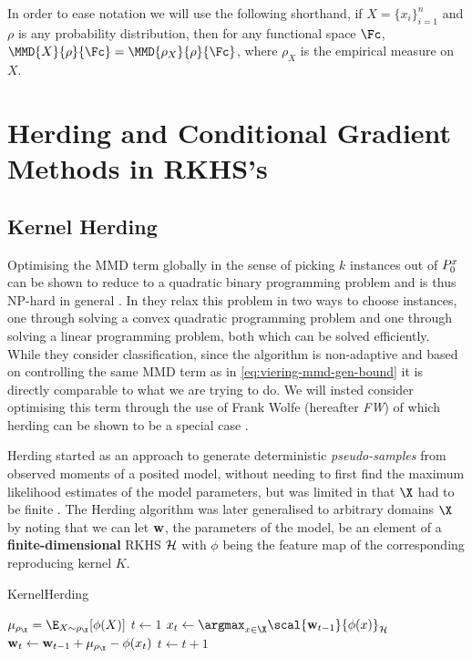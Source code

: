 In order to ease notation we will use the following shorthand, if \(X =
\{x_i\}_{i=1}^n\) and \(\rho\) is any probability distribution, then for any
functional space \(\Fc\), \(\MMD{X}{\rho}{\Fc} =
\MMD{\rho_X}{\rho}{\Fc}\), where \(\rho_X\) is the empirical measure
on \(X\).

\section{Herding and Conditional Gradient Methods in RKHS's}
\subsection{Kernel Herding}
Optimising the MMD term globally in the sense of
picking \(k\) instances out of \(P^x_{0}\) can be shown to reduce to a
quadratic binary programming problem and is thus NP-hard in general
\citep{chaovalitwongse09_quadr_integ_progr}. In
\citep{chattopadhyay13_batch_mode_activ_sampl_based} they relax this problem in
two ways to choose instances, one through solving a convex quadratic programming
problem and one through solving a linear programming problem, both which can be
solved efficiently. While they consider classification, since the algorithm is
non-adaptive and based on controlling the same MMD term as in
\ref{eq:viering-mmd-gen-bound} it is directly comparable to what we are trying
to do. We will insted consider optimising this term through the use of
Frank Wolfe \citep{frank56_algor_quadr_progr,jaggi13_revis_frank_wolfe}
(hereafter \textit{FW}) of which
herding can be shown to be a special case
\citep{bach12_equiv_between_herdin_condit_gradien_algor}.

Herding started as an approach to generate deterministic \emph{pseudo-samples}
from observed moments of a posited model, without needing to first find the
maximum likelihood estimates of the model parameters, but was limited in that
\(\X\) had to be finite \citep{welling09_herdin}. The Herding algorithm was later
generalised to arbitrary domains \(\X\) by
\citep{chen12_super_sampl_from_kernel_herdin} noting that we can let \(\mathbf{w}\),
the parameters of the model, be an element of a \textbf{finite-dimensional} RKHS
\(\mathcal{H}\) with \(\phi\) being the feature map of the corresponding
reproducing kernel \(K\).
\begin{algorithm}
  \caption{KernelHerding}\label{alg:kernel-herding}
  \begin{algorithmic}[1]
     \State $\mu_{\rho_{\X}} = \E_{X \sim
\rho_{\X}}[\phi(X)]$ \State $t \gets 1$  \State $x_{t} \gets
\argmax_{x \in \X} \scal{\mat{w}_{t-1}}{\phi(x)}_{\rkhs{H}}$ \State $\mat{w}_{t}
\gets \mat{w}_{t-1} + \mu_{\rho_{\X}} - \phi(x_{t})$ \State $t \gets t + 1$
\EndWhile
\EndProcedure
  \end{algorithmic}
\end{algorithm}

